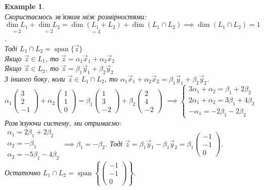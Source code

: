 \documentclass[a4paper, 10pt]{article}
\theoremstyle{theoremdd}
\newtheorem{example}[theorem]{Example}
\DeclareMathOperator{\linspan}{span}
\begin{document}
\begin{example}
	\bigskip \\
	Скористаємось зв'язком між розмірностями:\\
	$\underset{=2}{\dim L_1} + \underset{=2}{\dim L_2} = \underset{=3}{\dim (L_1+L_2)} + \dim(L_1 \cap L_2) \implies \dim (L_1 \cap L_2) = 1$.\\
	Тоді $L_1 \cap L_2 = \linspan\{\vec{z}\}$\\
	Якщо $\vec{z} \in L_1$, то $\vec{z} = \alpha_1 \vec{x}_1 + \alpha_2 \vec{x}_2$\\
	Якщо $\vec{z} \in L_2$, то $\vec{z} = \beta_1 \vec{y}_1 + \beta_2 \vec{y}_2$\\
	З іншого боку, коли $\vec{z} \in L_1 \cap L_2$, то $\alpha_1 \vec{x}_1 + \alpha_2 \vec{x}_2 = \beta_1 \vec{y}_1 + \beta_2 \vec{y}_2$.\\
	$\alpha_1 \begin{pmatrix} 3 \\ 2 \\ -1 \end{pmatrix} + \alpha_2 \begin{pmatrix} 1 \\ 1 \\ 0 \end{pmatrix} = \beta_1 \begin{pmatrix} 1 \\ 3 \\ -2 \end{pmatrix} + \beta_2 \begin{pmatrix} 2 \\ 4 \\ -2 \end{pmatrix}$
	$\implies \begin{cases}
	3 \alpha_1 + \alpha_2 = \beta_1 + 2 \beta_2 \\
	2 \alpha_1 + \alpha_2 = 3 \beta_1 + 4 \beta_2 \\
	- \alpha_1 = -2 \beta_1 - 2 \beta_2
	\end{cases}$\\
	Розв'язуючи систему, ми отримаємо:\\
	$\begin{gathered}
	\alpha_1 = 2\beta_1 + 2\beta_2 \\
	\alpha_2 = -\beta_1 \\
	\alpha_2 = -5\beta_1 - 4\beta_2
	\end{gathered} \implies \beta_1 = -\beta_2$. Тоді $\vec{z} =\beta_1 \vec{y}_1 - \beta_1 \vec{y}_2 = \beta_1 \begin{pmatrix} -1 \\ -1 \\ 0 \end{pmatrix}$.\\
	Остаточно $L_1 \cap L_2 = \linspan\left\{ \begin{pmatrix} -1 \\ -1 \\ 0 \end{pmatrix} \right\}$.
	\end{example}
	
\end{document}
